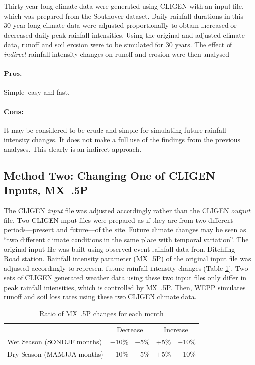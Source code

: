 Thirty year-long climate data were generated using CLIGEN with an input file,
which was prepared from the Southover dataset. Daily rainfall durations in this
30 year-long climate data were adjusted proportionally to obtain increased or
decreased daily peak rainfall intensities. Using the original and adjusted
climate data, runoff and soil erosion were to be simulated for 30 years. The
effect of \textit{indirect} rainfall intensity changes on runoff and erosion
were then analysed.

\paragraph{Pros:}
\label{sec:ProsMethodOne}
Simple, easy and fast.
\paragraph{Cons:}
\label{sec:ConsMethodOne}
It may be considered to be crude and simple for simulating future rainfall
intensity changes. It does not make a full use of the findings from the previous
analyses. This clearly is an indirect approach.

\subsection{Method Two: Changing One of CLIGEN Inputs, MX~.5P}
\label{sec:MethodTwo}

The CLIGEN \emph{input} file was adjusted accordingly rather than the CLIGEN
\textit{output} file. Two CLIGEN input files were prepared as if they are from
two different periods---present and future---of the site. Future climate changes
may be seen as ``two different climate conditions in the same place with
temporal variation''. The original input file was built using observed event
rainfall data from Ditchling Road station. Rainfall intensity parameter (MX~.5P)
of the original input file was adjusted accordingly to represent future rainfall
intensity changes (Table \ref{tab:MX5PChanges}). Two sets of CLIGEN generated
weather data using these two input files only differ in peak rainfall
intensities, which is controlled by MX~.5P. Then, WEPP simulates runoff and soil
loss rates using these two CLIGEN climate data.

\begin{table}[htpb]
  \centering
  \caption{Ratio of MX~.5P changes for each month}
  \label{tab:MX5PChanges}
    \begin{tabular}{lcccc}
    \toprule
    & \multicolumn{2}{c}{Decrease} & \multicolumn{2}{c}{Increase} \\
    \cmidrule(r){2-3} \cmidrule(l){4-5}
    Wet Season (SONDJF months)   & $-$10\% &  $-$5\%  & $+$5\%  & $+$10\% \\
    Dry Season (MAMJJA months)   & $-$10\%  & $-$5\%  & $+$5\%  & $+$10\% \\
    \bottomrule
    \end{tabular}
\end{table}

